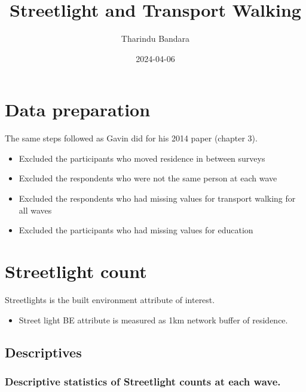 \documentclass[
]{book}
\title{Streetlight and Transport Walking}
\author{Tharindu Bandara}
\date{2024-04-06}
\providecommand{\tightlist}{%
  \setlength{\itemsep}{0pt}\setlength{\parskip}{0pt}}
\begin{document}
\maketitle

{
\setcounter{tocdepth}{1}
\tableofcontents
}
\hypertarget{data-preparation}{%
\chapter{Data preparation}\label{data-preparation}}

The same steps followed as Gavin did for his 2014 paper (chapter 3).

\begin{itemize}
\tightlist
\item
  Excluded the participants who moved residence in between surveys
\item
  Excluded the respondents who were not the same person at each wave
\item
  Excluded the respondents who had missing values for transport walking for all waves
\item
  Excluded the participants who had missing values for education
\end{itemize}

\hypertarget{streetlight-count}{%
\chapter{Streetlight count}\label{streetlight-count}}

Streetlights is the built environment attribute of interest.

\begin{itemize}
\tightlist
\item
  Street light BE attribute is measured as 1km network buffer of residence.
\end{itemize}

\hypertarget{descriptives}{%
\section{Descriptives}\label{descriptives}}

\hypertarget{descriptive-statistics-of-streetlight-counts-at-each-wave.}{%
\subsection{Descriptive statistics of Streetlight counts at each wave.}\label{descriptive-statistics-of-streetlight-counts-at-each-wave.}}
\end{document}

